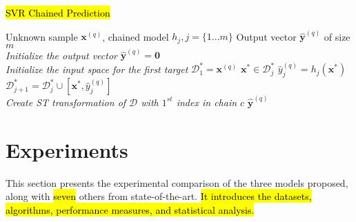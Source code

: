 \documentclass[preprint,12pt]{elsarticle}
\begin{document}
\begin{algorithm}[H]
\caption{\hl{SVR Chained Prediction}}
\small
\label{alg:SVRCP} 
\begin{algorithmic}[1]
\renewcommand{\algorithmicrequire}{\textbf{Input:}}
\renewcommand{\algorithmicensure}{\textbf{Output:}}
\REQUIRE Unknown sample $\bm x^{(q)}$, chained model ${h_j, j=\{1...m\}}$
\ENSURE  Output vector $\hat{\bm y}^{(q)}$ of size $m$
\\ \textit{Initialize the output vector}
\STATE $\hat{\bm y}^{(q)} = \textbf{0}$
\\ \textit{Initialize the input space for the first target}
\STATE $\mathcal{D}_1^* = \bm x^{(q)}$
\STATE $\bm x^* \in \mathcal{D}_j^*$
\STATE $\hat{y}_j^{(q)} = h_j(\bm x^*)$
\STATE $\mathcal{D}_{j+1}^* = \mathcal{D}_j^* \cup [\bm x^*, \hat{y}_j^{(q)}]$
\ENDFOR
\\ \textit{Create ST transformation of $\mathcal{D}$ with $1^{st}$ index in chain $c$}
\RETURN $\hat{\bm y}^{(q)}$ 
\end{algorithmic} 
\end{algorithm}

\section{Experiments}\label{sec:experiments}
This section presents the experimental comparison of the three models proposed, along with  \hl{seven} others from state-of-the-art. \hl{It introduces the datasets, algorithms, performance measures, and statistical analysis.} 
\end{document}
